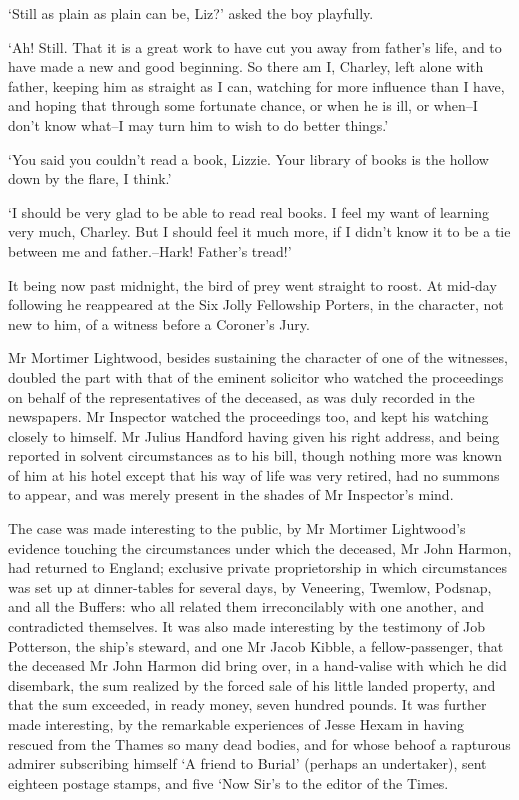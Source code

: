 ‘Still as plain as plain can be, Liz?’ asked the boy playfully.

‘Ah! Still. That it is a great work to have cut you away from father’s
life, and to have made a new and good beginning. So there am I, Charley,
left alone with father, keeping him as straight as I can, watching
for more influence than I have, and hoping that through some fortunate
chance, or when he is ill, or when--I don’t know what--I may turn him to
wish to do better things.’

‘You said you couldn’t read a book, Lizzie. Your library of books is the
hollow down by the flare, I think.’

‘I should be very glad to be able to read real books. I feel my want of
learning very much, Charley. But I should feel it much more, if I didn’t
know it to be a tie between me and father.--Hark! Father’s tread!’

It being now past midnight, the bird of prey went straight to roost. At
mid-day following he reappeared at the Six Jolly Fellowship Porters, in
the character, not new to him, of a witness before a Coroner’s Jury.

Mr Mortimer Lightwood, besides sustaining the character of one of the
witnesses, doubled the part with that of the eminent solicitor who
watched the proceedings on behalf of the representatives of the
deceased, as was duly recorded in the newspapers. Mr Inspector watched
the proceedings too, and kept his watching closely to himself. Mr Julius
Handford having given his right address, and being reported in solvent
circumstances as to his bill, though nothing more was known of him at
his hotel except that his way of life was very retired, had no summons
to appear, and was merely present in the shades of Mr Inspector’s mind.

The case was made interesting to the public, by Mr Mortimer Lightwood’s
evidence touching the circumstances under which the deceased, Mr John
Harmon, had returned to England; exclusive private proprietorship in
which circumstances was set up at dinner-tables for several days, by
Veneering, Twemlow, Podsnap, and all the Buffers: who all related them
irreconcilably with one another, and contradicted themselves. It was
also made interesting by the testimony of Job Potterson, the ship’s
steward, and one Mr Jacob Kibble, a fellow-passenger, that the deceased
Mr John Harmon did bring over, in a hand-valise with which he did
disembark, the sum realized by the forced sale of his little landed
property, and that the sum exceeded, in ready money, seven hundred
pounds. It was further made interesting, by the remarkable experiences
of Jesse Hexam in having rescued from the Thames so many dead bodies,
and for whose behoof a rapturous admirer subscribing himself ‘A friend
to Burial’ (perhaps an undertaker), sent eighteen postage stamps, and
five ‘Now Sir’s to the editor of the Times.

